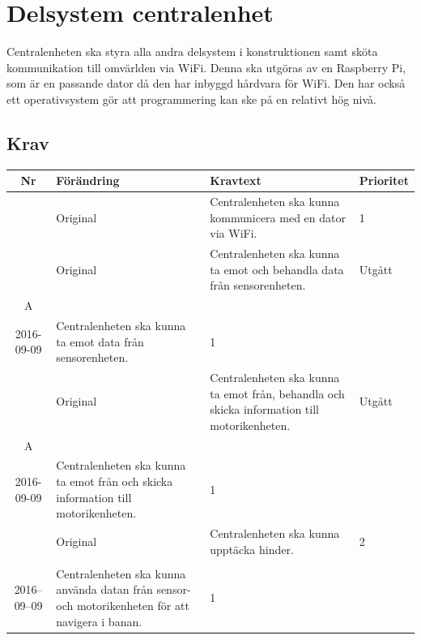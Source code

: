 \documentclass[a4paper,titlepage,12pt]{article}
\newcounter{reqNr}
\newcommand{\nextReqNr}{\stepcounter{reqNr}\arabic{reqNr}}
\newcounter{reqNrII}
\newcommand{\nextReqNrII}{\stepcounter{reqNrII}\arabic{reqNrII}}
\newcommand{\newContent}[1] {\pbox{5cm}{Nytt innehåll i \arabic{reqNr}\\#1}}
\newcommand{\newRequirement}[1] {\pbox{5cm}{Tillagt \\#1}}
\begin{document}
	\section{Delsystem centralenhet}
	Centralenheten ska styra alla andra delsystem i konstruktionen samt sköta
	kommunikation till omvärlden via WiFi. Denna ska utgöras av en Raspberry
	Pi, som är en passande dator då den har inbyggd hårdvara för WiFi. Den har 
	också ett operativsystem gör att programmering kan ske på en relativt hög nivå.

	\subsection{Krav}
	\begin{longtable}[c]{ c l>{\raggedright}p{} l }
		\textbf{Nr} & \textbf{Förändring} & \textbf{Kravtext} & \textbf{Prioritet} 
			\\ \midrule

		\nextReqNr{} & Original & Centralenheten ska kunna kommunicera 
			med en dator via WiFi. & 1
			\\ \midrule

		\nextReqNr{} & Original & Centralenheten ska kunna ta emot och 
			behandla data från sensorenheten.& Utgått
			\\ \hline
		\arabic{reqNr}A & \newContent{2016-09-09} & Centralenheten ska kunna ta emot 
			data från sensorenheten.& 1
			\\ \midrule

		\nextReqNr{} & Original & Centralenheten ska kunna ta emot från, 
			behandla och skicka information till motorikenheten. & Utgått
			\\ \hline

		\arabic{reqNr}A & \newContent{2016-09-09} & Centralenheten ska kunna ta emot från
			 och skicka information till motorikenheten. & 1
			\\ \midrule

		\nextReqNr{} & Original & Centralenheten ska kunna upptäcka hinder. & 2
		\\ \midrule

		\nextReqNrII{} & \newRequirement{2016--09--09} & Centralenheten ska kunna använda
		datan från sensor- och motorikenheten för att navigera i banan.  & 1
	\end{longtable}
\end{document}
